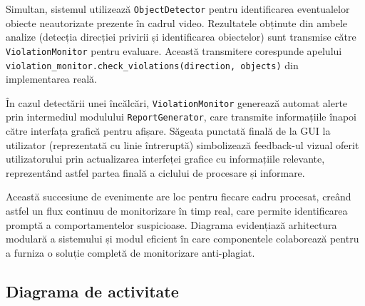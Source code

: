 \documentclass[12pt,a4paper]{article}
\begin{document}
Simultan, sistemul utilizează \texttt{ObjectDetector} pentru identificarea eventualelor obiecte neautorizate prezente în cadrul video. Rezultatele obținute din ambele analize (detecția direcției privirii și identificarea obiectelor) sunt transmise către \texttt{ViolationMonitor} pentru evaluare. Această transmitere corespunde apelului \texttt{violation\_monitor.check\_violations(direction, objects)} din implementarea reală.

În cazul detectării unei încălcări, \texttt{ViolationMonitor} generează automat alerte prin intermediul modulului \texttt{ReportGenerator}, care transmite informațiile înapoi către interfața grafică pentru afișare. Săgeata punctată finală de la GUI la utilizator (reprezentată cu linie întreruptă) simbolizează feedback-ul vizual oferit utilizatorului prin actualizarea interfeței grafice cu informațiile relevante, reprezentând astfel partea finală a ciclului de procesare și informare.

Această succesiune de evenimente are loc pentru fiecare cadru procesat, creând astfel un flux continuu de monitorizare în timp real, care permite identificarea promptă a comportamentelor suspicioase. Diagrama evidențiază arhitectura modulară a sistemului și modul eficient în care componentele colaborează pentru a furniza o soluție completă de monitorizare anti-plagiat.

\subsection{Diagrama de activitate}
\end{document}
